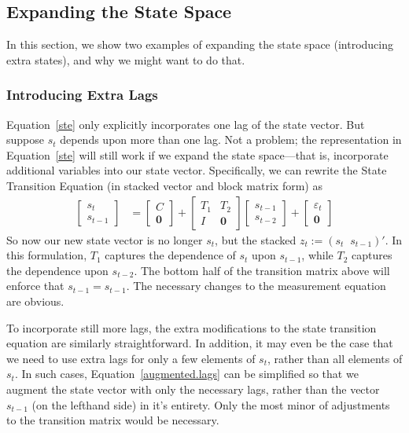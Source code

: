 \documentclass[a4paper,12pt]{article}
\begin{document}
\newpage
\subsection{Expanding the State Space}

In this section, we show two examples of expanding the state space
(introducing extra states), and why we might want to do that.

\subsubsection{Introducing Extra Lags}

Equation~\ref{ste} only explicitly incorporates one lag of the state
vector. But suppose $s_t$ depends upon more than one lag. Not a problem;
the representation in Equation~\ref{ste} will still work if we expand
the state space---that is, incorporate additional variables into our
state vector. Specifically, we can rewrite the State Transition Equation
(in stacked vector and block matrix form) as
\begin{align}
  \begin{bmatrix} s_{t} \\ s_{t-1}
  \end{bmatrix}
     &=
  \begin{bmatrix} C \\ \mathbf{0}
  \end{bmatrix}
  +\begin{bmatrix} T_1 & T_2 \\ I & \mathbf{0}
  \end{bmatrix}
  \begin{bmatrix} s_{t-1} \\ s_{t-2}
  \end{bmatrix}
  + \begin{bmatrix}
      \varepsilon_{t}  \\ \mathbf{0}
    \end{bmatrix}
  \label{augmented.lags}
\end{align}
So now our new state vector is no longer $s_t$, but the stacked $z_t:=(s_t \;\; s_{t-1})'$. In this formulation, $T_1$ captures the dependence of $s_t$ upon $s_{t-1}$, while $T_2$ captures the dependence upon $s_{t-2}$. The bottom half of the transition matrix above will enforce that $s_{t-1}=s_{t-1}$. The necessary changes to the measurement equation are obvious.

To incorporate still more lags, the extra modifications to the state
transition equation are similarly straightforward. In addition, it may
even be the case that we need to use extra lags for only a few elements
of $s_t$, rather than all elements of $s_t$. In such cases,
Equation~\ref{augmented.lags} can be simplified so that we augment the
state vector with only the necessary lags, rather than the vector
$s_{t-1}$ (on the lefthand side) in it's entirety. Only the most minor
of adjustments to the transition matrix would be necessary.
\end{document}
